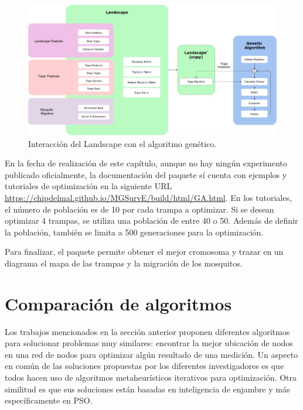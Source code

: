 \documentclass[letterpaper]{report}
\begin{document}
    \begin{figure}[ht!]
      \includegraphics[width=\textwidth]{fig:mgsurve-landscape-diagram.jpeg}
      \centering
      \caption{Interacción del Landscape con el algoritmo genético.}
      \label{fig:mgsurve-landscape-diagram}
      \centering
    \end{figure}

    En la fecha de realización de este capítulo, aunque no hay ningún
    experimento publicado oficialmente, la documentación del paquete sí cuenta
    con ejemplos y tutoriales de optimización en la siguiente URL
    \url{https://chipdelmal.github.io/MGSurvE/build/html/GA.html}. En los
    tutoriales, el número de población es de 10 por cada trampa a optimizar. Si
    se desean optimizar 4 trampas, se utiliza una población de entre 40 o 50.
    Además de definir la población, también se limita a 500 generaciones para
    la optimización.

    Para finalizar, el paquete permite obtener el mejor cromosoma y trazar en un
    diagrama el mapa de las trampas y la migración de los mosquitos.

\section{Comparación de algoritmos}
  \label{section:analisis}
  Los trabajos mencionados en la sección anterior proponen diferentes algoritmos
  para solucionar problemas muy similares: encontrar la mejor ubicación de nodos
  en una red de nodos para optimizar algún resultado de una medición. Un aspecto
  en común de las soluciones propuestas por los diferentes investigadores es que
  todos hacen uso de algoritmos metaheurísticos iterativos para optimización.
  Otra similitud es que sus soluciones están basadas en inteligencia de enjambre
  y más específicamente en PSO. 
\end{document}

